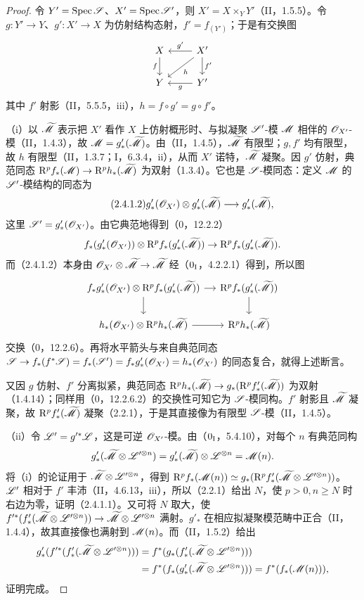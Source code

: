 \begin{proof}
令 $Y'=\operatorname{Spec}\mathscr S$、$X'=\operatorname{Spec}\mathscr S'$，则 $X'=X\times_YY'$（II，1.5.5）。令 $g:Y'\to Y$、$g':X'\to X$ 为仿射结构态射，$f'=f_{(Y')}$；于是有交换图
\[
\begin{tikzcd}
X\arrow[d,"f"']&X'\arrow[l,"g'"']\arrow[d,"f'"]\arrow[dl,"h",description]\\
Y&Y'\arrow[l,"g"]
\end{tikzcd}
\]
其中 $f'$ 射影（II，5.5.5，iii），$h=f\circ g'=g\circ f'$。

（i）以 $\widetilde{\mathscr M}$ 表示把 $X'$ 看作 $X$ 上仿射概形时、与拟凝聚 $\mathscr S'$-模 $\mathscr M$ 相伴的 $\mathscr O_{X'}$-模（II，1.4.3），故 $\mathscr M=g'_*(\widetilde{\mathscr M})$。由（II，1.4.5），$\widetilde{\mathscr M}$ 有限型；$g,f'$ 均有限型，故 $h$ 有限型（II，1.3.7；I，6.3.4，ii），从而 $X'$ 诺特，$\widetilde{\mathscr M}$ 凝聚。因 $g'$ 仿射，典范同态
$\mathrm R^pf_*(\mathscr M)\to\mathrm R^ph_*(\widetilde{\mathscr M})$ 为双射（1.3.4）。它也是 $\mathscr S$-模同态：定义 $\mathscr M$ 的 $\mathscr S'$-模结构的同态为
\begin{equation}\tag{2.4.1.2}
g'_*(\mathscr O_{X'})\otimes g'_*(\widetilde{\mathscr M})\longrightarrow g'_*(\widetilde{\mathscr M}),
\end{equation}
这里 $\mathscr S'=g'_*(\mathscr O_{X'})$。由它典范地得到（0，12.2.2）
\[
f_*(g'_*(\mathscr O_{X'}))\otimes\mathrm R^pf_*(g'_*(\widetilde{\mathscr M}))\to
\mathrm R^pf_*(g'_*(\widetilde{\mathscr M})).
\]
而（2.4.1.2）本身由 $\mathscr O_{X'}\otimes\widetilde{\mathscr M}\to\widetilde{\mathscr M}$ 经（$0_{\mathrm I}$，4.2.2.1）得到，所以图
\[
\begin{tikzcd}[column sep=small]
f_*g'_*(\OO_{X'})\otimes\mathrm R^pf_*(g'_*(\wt\M))\arrow[r]\arrow[d]&\mathrm R^pf_*(g'_*(\wt\M))\arrow[d]\\
h_*(\OO_{X'})\otimes\mathrm R^ph_*(\wt\M)\arrow[r]&\mathrm R^ph_*(\wt\M)
\end{tikzcd}
\]
交换（0，12.2.6）。再将水平箭头与来自典范同态
$\mathscr S\to f_*(f^*\mathscr S)=f_*(\mathscr S')=f_*g'_*(\mathscr O_{X'})=h_*(\mathscr O_{X'})$
的同态复合，就得上述断言。

又因 $g$ 仿射、$f'$ 分离拟紧，典范同态
$\mathrm R^ph_*(\widetilde{\mathscr M})\to g_*(\mathrm R^pf'_*(\widetilde{\mathscr M}))$
为双射（1.4.14）；同样用（0，12.2.6.2）的交换性可知它为 $\mathscr S$-模同构。$f'$ 射影且 $\widetilde{\mathscr M}$ 凝聚，故 $\mathrm R^pf'_*(\widetilde{\mathscr M})$ 凝聚（2.2.1），于是其直接像为有限型 $\mathscr S$-模（II，1.4.5）。

（ii）令 $\mathscr L'=g'^*\mathscr L$，这是可逆 $\mathscr O_{X'}$-模。由（$0_{\mathrm I}$，5.4.10），对每个 $n$ 有典范同构
\[
g'_*(\widetilde{\mathscr M}\otimes\mathscr L'^{\otimes n})=g'_*(\widetilde{\mathscr M})\otimes\mathscr L^{\otimes n}=\mathscr M(n).
\]
将（i）的论证用于 $\widetilde{\mathscr M}\otimes\mathscr L'^{\otimes n}$，得到
$\mathrm R^pf_*(\mathscr M(n))\simeq g_*(\mathrm R^pf'_*(\widetilde{\mathscr M}\otimes\mathscr L'^{\otimes n}))$。
$\mathscr L'$ 相对于 $f'$ 丰沛（II，4.6.13，iii），所以（2.2.1）给出 $N$，使 $p>0,n\geq N$ 时右边为零，证明（2.4.1.1）。又可将 $N$ 取大，使
$f'^*(f'_*(\widetilde{\mathscr M}\otimes\mathscr L'^{\otimes n}))\to\widetilde{\mathscr M}\otimes\mathscr L'^{\otimes n}$
满射。$g'_*$ 在相应拟凝聚模范畴中正合（II，1.4.4），故其直接像也满射到 $\mathscr M(n)$。而（II，1.5.2）给出
\[
\begin{aligned}
g'_*(f'^*(f'_*(\widetilde{\mathscr M}\otimes\mathscr L'^{\otimes n})))
&=f^*(g_*(f'_*(\widetilde{\mathscr M}\otimes\mathscr L'^{\otimes n})))\\
&=f^*(f_*(g'_*(\widetilde{\mathscr M}\otimes\mathscr L'^{\otimes n})))
=f^*(f_*(\mathscr M(n))),
\end{aligned}
\]
证明完成。
\end{proof}

